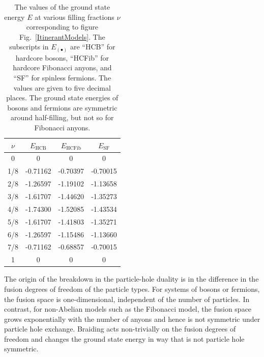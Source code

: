 \documentclass[aps,reprint,superscriptaddress,amsmath,amssymb,amsfonts,prb]{revtex4-1}
\begin{document}
\begin{table}
\begin{ruledtabular}
\begin{tabular}{  c  c  c  c }
$\nu$   &  $E_{\text{HCB}}$  &  $E_{\text{HCFib}}$      &  $E_{\text{SF}}$    \\ \hline
0     &        0                &          0            &         0           \\ 
1/8   &    -0.71162             &      -0.70397         &     -0.70015        \\  
2/8   &    -1.26597             &      -1.19102         &     -1.13658        \\ 
3/8   &    -1.61707             &      -1.44620         &     -1.35273        \\ 
4/8   &    -1.74300             &      -1.52085         &     -1.43534        \\
5/8   &    -1.61707             &      -1.41803         &     -1.35271        \\
6/8   &    -1.26597             &      -1.15486         &     -1.13660        \\
7/8   &    -0.71162             &      -0.68857         &     -0.70015        \\
1     &       0                 &          0            &         0           \\
\end{tabular}
\end{ruledtabular}
\caption{The values of the ground state energy $E$ at various filling fractions $\nu$ corresponding to figure Fig.~\ref{ItinerantModels}. The subscripts in $E_{(\bullet)}$ are ``HCB'' for hardcore bosons, ``HCFib'' for hardcore Fibonacci anyons, and ``SF'' for spinless fermions. The values are given to five decimal places. The ground state energies of bosons and fermions are symmetric around half-filling, but not so for Fibonacci anyons.}
\label{GroundStateEnergyItinerantModels}
\end{table}

{The origin of the breakdown in the particle-hole duality is in the difference {in} the fusion degrees of freedom of the particle types. For systems of bosons or fermions, the fusion space is one-dimensional, independent of the number of particles. In contrast, for non-Abelian models such as the Fibonacci model, the fusion space grows exponentially with 
the number of anyons and hence is not symmetric under particle hole exchange. Braiding acts non-trivially on the fusion degrees of freedom and changes the ground state energy in way that is not particle hole symmetric.}
\end{document}
